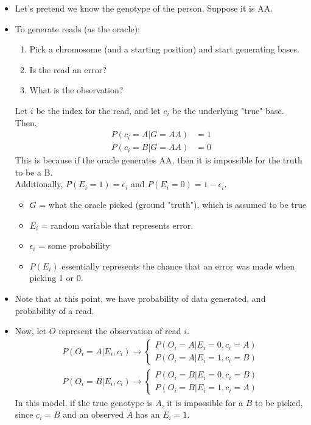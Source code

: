 \documentclass[10pt]{article}
\begin{document}
\begin{itemize}
    \item Let's pretend we know the genotype of the person.  Suppose it is AA.
    \item To generate reads (as the oracle):
    \begin{enumerate}
        \item Pick a chromosome (and a starting position) and start generating bases.
        \item Is the read an error?
        \item What is the observation?
    \end{enumerate}
    Let $i$ be the index for the read, and let $c_i$ be the underlying "true" base.\\
    Then, 
    \begin{align*}
    P(c_i = A \vert G = AA) &= 1\\
    P(c_i = B \vert G = AA) &= 0
    \end{align*}
    This is because if the oracle generates AA, then it is impossible for the truth to be a B.\\
    Additionally, $P(E_i = 1) = \epsilon_i$ and $P(E_i = 0) = 1 - \epsilon_i$.
    \begin{itemize}
        \item $G$ = what the oracle picked (ground "truth"), which is assumed to be true
        \item $E_i$ = random variable that represents error.
        \item $\epsilon_i$ = some probability
        \item $P(E_i)$ essentially represents the chance that an error was made when picking 1 or 0.
    \end{itemize}
    \item Note that at this point, we have probability of data generated, and probability of a read.
    \item Now, let $O$ represent the observation of read $i$.
    \begin{align*}
        P(O_i = A \vert E_i, c_i) \rightarrow \begin{cases} P(O_i = A \vert E_i = 0, c_i = A) \\ P(O_i = A \vert E_i = 1, c_i = B)\end{cases}\\
        P(O_i = B \vert E_i, c_i) \rightarrow \begin{cases} P(O_i = B \vert E_i = 0, c_i = B) \\ P(O_i = B \vert E_i = 1, c_i = A)\end{cases}
    \end{align*}
    In this model, if the true genotype is $A$, it is impossible for a $B$ to be picked, since $c_i = B$ and an observed $A$ has an $E_i = 1$.  
\end{itemize}
\end{document}
